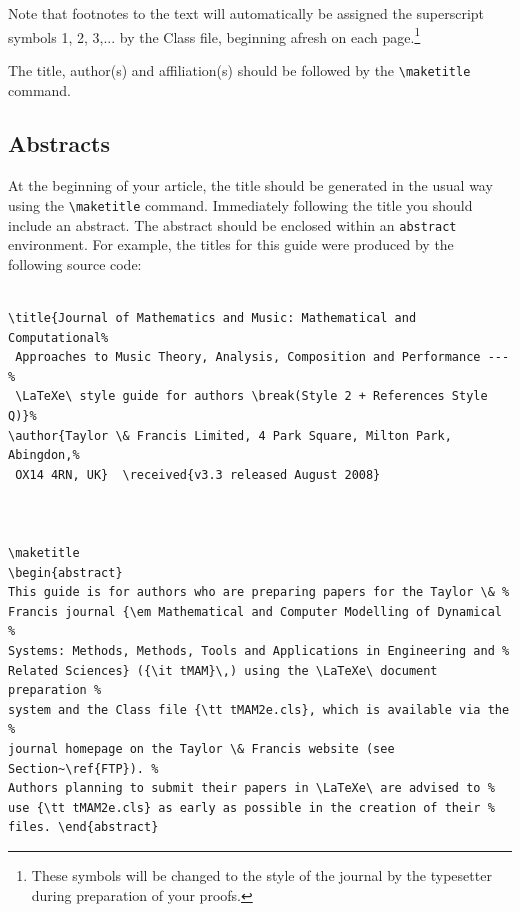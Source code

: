 \documentclass[]{tMAM2e}
\begin{document}
Note that footnotes to the text will automatically be assigned the superscript symbols 1, 2, 3,... by the Class file, beginning afresh on each page.\footnote{These symbols will be changed to the style of the journal by the typesetter during preparation of your proofs.}

The title, author(s) and affiliation(s) should be followed by the
 {\verb"\maketitle"} command.

\subsection{Abstracts}

At the beginning of your article, the title should be generated in
the usual way using the {\verb"\maketitle"} command. Immediately
following the title you should include an abstract. The abstract
should be enclosed within an {\tt abstract} environment. For
example, the titles for this guide were produced by the following
source code:
%
\begin{verbatim}

\title{Journal of Mathematics and Music: Mathematical and Computational%
 Approaches to Music Theory, Analysis, Composition and Performance ---%
 \LaTeXe\ style guide for authors \break(Style 2 + References Style Q)}%
\author{Taylor \& Francis Limited, 4 Park Square, Milton Park, Abingdon,%
 OX14 4RN, UK}  \received{v3.3 released August 2008}



\maketitle
\begin{abstract}
This guide is for authors who are preparing papers for the Taylor \& %
Francis journal {\em Mathematical and Computer Modelling of Dynamical %
Systems: Methods, Methods, Tools and Applications in Engineering and %
Related Sciences} ({\it tMAM}\,) using the \LaTeXe\ document preparation %
system and the Class file {\tt tMAM2e.cls}, which is available via the %
journal homepage on the Taylor \& Francis website (see Section~\ref{FTP}). %
Authors planning to submit their papers in \LaTeXe\ are advised to %
use {\tt tMAM2e.cls} as early as possible in the creation of their %
files. \end{abstract}

\end{verbatim}
\end{document}

